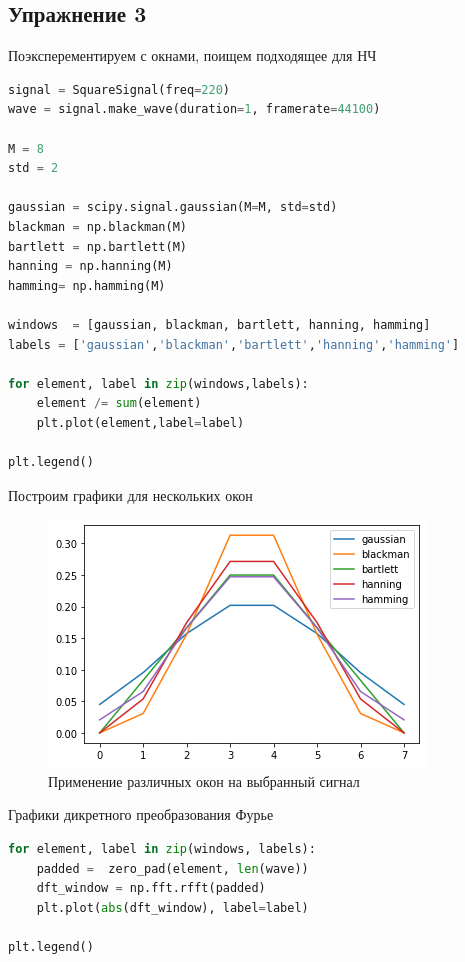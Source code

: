 \subsection{Упражнение 3}

Поэксперементируем с окнами, поищем подходящее для НЧ

\begin{lstlisting}[language=Python]
signal = SquareSignal(freq=220)
wave = signal.make_wave(duration=1, framerate=44100)

M = 8
std = 2

gaussian = scipy.signal.gaussian(M=M, std=std)
blackman = np.blackman(M)
bartlett = np.bartlett(M)
hanning = np.hanning(M)
hamming= np.hamming(M)

windows  = [gaussian, blackman, bartlett, hanning, hamming]
labels = ['gaussian','blackman','bartlett','hanning','hamming']

for element, label in zip(windows,labels):
    element /= sum(element)
    plt.plot(element,label=label)
    
plt.legend()
\end{lstlisting}

Построим графики для нескольких окон

\begin{figure}[H]
	\begin{center}
		\includegraphics[scale=1]{fig/lab08/lab08_07.png}
		\caption{Применение различных окон на выбранный сигнал}
	\end{center}
\end{figure}

Графики дикретного преобразования Фурье

\begin{lstlisting}[language=Python]
for element, label in zip(windows, labels):
    padded =  zero_pad(element, len(wave))
    dft_window = np.fft.rfft(padded)
    plt.plot(abs(dft_window), label=label)
    
plt.legend()
\end{lstlisting}

